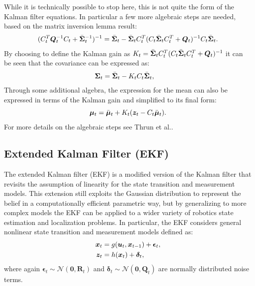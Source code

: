 While it is technically possible to stop here, this is not quite the form of the Kalman filter equations. In particular a few more algebraic steps are needed, based on the matrix inversion lemma result:
\begin{equation*}
(C_t^T \bm{Q}_t^{-1} C_t + \bar{\bm{\Sigma}}_t^{-1})^{-1} = \bar{\bm{\Sigma}}_t - \bar{\bm{\Sigma}}_tC_t^T(C_t\bar{\bm{\Sigma}}_tC_t^T + \bm{Q}_t)^{-1}C_t\bar{\bm{\Sigma}}_t.
\end{equation*}
By choosing to define the Kalman gain as $K_t = \bar{\bm{\Sigma}}_{t}C_t^{T}(C_t\bar{\bm{\Sigma}}_{t}C_t^{T}+\bm{Q}_t)^{-1}$ it can be seen that the covariance can be expressed as:
\begin{equation*}
\begin{split}
\bm{\Sigma}_t &= \bar{\bm{\Sigma}}_t - K_tC_t\bar{\bm{\Sigma}}_t,
\end{split}
\end{equation*}
Through some additional algebra, the expression for the mean can also be expressed in terms of the Kalman gain and simplified to its final form:
\begin{equation*}
\bm{\mu}_t = \bar{\bm{\mu}}_t + K_t(\bm{z}_t-C_t\bar{\bm{\mu}}_{t}).
\end{equation*}
For more details on the algebraic steps see Thrun et al.\cite{ThrunBurgardEtAl2005}.


\subsection{Extended Kalman Filter (EKF)}
The extended Kalman filter (EKF) is a modified version of the Kalman filter that revisits the assumption of linearity for the state transition and measurement models. This extension still exploits the Gaussian distribution to represent the belief in a computationally efficient parametric way, but by generalizing to more complex models the EKF can be applied to a wider variety of robotics state estimation and localization problems. In particular, the EKF considers general nonlinear state transition and measurement models defined as:
\begin{equation}
\begin{split}
\bm{x}_t &= g(\bm{u}_t, \bm{x}_{t-1}) + \bm{\epsilon}_{t}, \\
\bm{z}_t &= h(\bm{x}_t) + \bm{\delta}_{t},
\end{split}
\end{equation}
where again $\bm{\epsilon}_{t}\sim \mathcal{N}(\bm{0},\bm{R}_t)$ and $\bm{\delta}_{t}\sim \mathcal{N}(\bm{0},\bm{Q}_t)$ are normally distributed noise terms.

